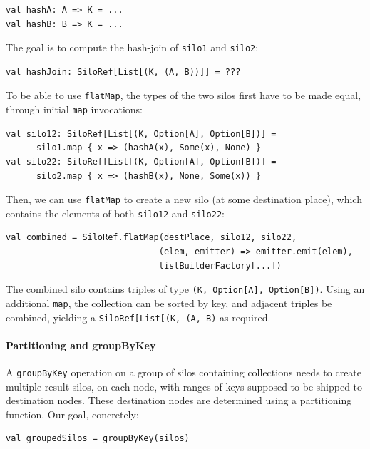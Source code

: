 \documentclass[preprint]{sigplanconf}
\theoremstyle{definition}
\theoremstyle{definition}
\begin{document}
\begin{lstlisting}
val hashA: A => K = ...
val hashB: B => K = ...
\end{lstlisting}

The goal is to compute the hash-join of \verb|silo1| and \verb|silo2|:

\begin{lstlisting}
val hashJoin: SiloRef[List[(K, (A, B))]] = ???
\end{lstlisting}

To be able to use \verb|flatMap|, the types of the two silos first have to be
made equal, through initial \verb|map| invocations:


\begin{lstlisting}
val silo12: SiloRef[List[(K, Option[A], Option[B])] =
      silo1.map { x => (hashA(x), Some(x), None) }
val silo22: SiloRef[List[(K, Option[A], Option[B])] =
      silo2.map { x => (hashB(x), None, Some(x)) }
\end{lstlisting}

Then, we can use \verb|flatMap| to create a new silo (at some destination
place), which contains the elements of both \verb|silo12| and \verb|silo22|:

\begin{lstlisting}
val combined = SiloRef.flatMap(destPlace, silo12, silo22,
                              (elem, emitter) => emitter.emit(elem),
                              listBuilderFactory[...])
\end{lstlisting}

The combined silo contains triples of type \verb|(K, Option[A], Option[B])|.
Using an additional \verb|map|, the collection can be sorted by key, and adjacent
triples be combined, yielding a \texttt{SiloRef[List[(K, (A, B)} as required.


\paragraph{Partitioning and groupByKey}

A \verb|groupByKey| operation on a group of silos containing collections needs
to create multiple result silos, on each node, with ranges of keys supposed to
be shipped to destination nodes. These destination nodes are determined using
a partitioning function. Our goal, concretely:

\begin{lstlisting}
val groupedSilos = groupByKey(silos)
\end{lstlisting}
\end{document}
